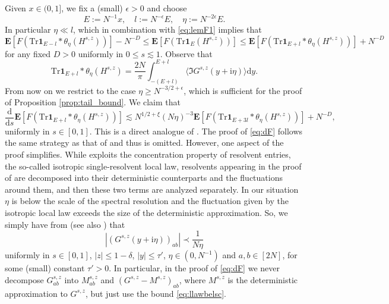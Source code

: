 \documentclass[10pt]{amsart}
\numberwithin{equation}{section}
\newcommand{\dif}{\mathrm{d}}
\newcommand{\E}{\mathbf{E}}
\newcommand{\ii}{\mathrm{i}}
\begin{document}
Given $x\in(0, 1]$, we fix a (small) $\epsilon>0$ and choose 
\begin{equation}
E:=N^{-1}x,\quad l:=N^{-\epsilon}E,\quad \eta:=N^{-2\epsilon}E.
\label{eq:F_GFT_param}
\end{equation}
In particular $\eta\ll l$, which in combination with \eqref{eq:lemF1} implies that
\begin{equation}
\E\left[F\left(\mathrm{Tr}\bm{1}_{E-l}*\theta_\eta(H^{s,z})\right)\right] - N^{-D}\le \E\left[F\left(\mathrm{Tr} \bm{1}_E(H^{s,z})\right)\right] \le \E\left[F\left(\mathrm{Tr}\bm{1}_{E+l}*\theta_\eta(H^{s,z})\right)\right] + N^{-D}
\label{eq:lemF2}
\end{equation}
for any fixed $D>0$ uniformly in $0\le s\lesssim 1$. Observe that
\begin{equation}
\mathrm{Tr}\bm{1}_{E+l}*\theta_\eta(H^{s,z}) = \frac{2N}{\pi}\int_{-(E+l)}^{E+l} \langle \Im G^{s,z}(y+\ii\eta)\rangle\dif y.
\label{eq:Tr_to_int}
\end{equation}
From now on we restrict to the case $\eta\ge N^{-3/2+\epsilon}$, which is sufficient for the proof of Proposition \ref{prop:tail_bound}. We claim that
\begin{equation}
\frac{\dif}{\dif s} \E \left[ F\left(\mathrm{Tr}\bm{1}_{E+l}*\theta_\eta(H^{s,z})\right)\right]\lesssim N^{1/2+\xi} (N\eta)^{-3}  \E \left[ F\left(\mathrm{Tr}\bm{1}_{E+3l}*\theta_\eta(H^{s,z})\right)\right] + N^{-D},
\label{eq:dF}
\end{equation}
uniformly in $s\in [0,1]$. This is a direct analogue of \cite[Eq.(2.62)]{small_dev}. The proof of \eqref{eq:dF} follows the same strategy as that of \cite[Eq.(2.62)]{small_dev} and thus is omitted. However, one aspect of the proof simplifies. While \cite{small_dev} exploits the concentration property of resolvent entries, the so-called isotropic single-resolvent local law, resolvents appearing in the proof of \cite[Eq.(2.62)]{small_dev} are decomposed into their deterministic counterparts and the fluctuations around them, and then these two terms are analyzed separately. In our situation $\eta$ is below the scale of the spectral resolution and the fluctuation given by the isotropic local law exceeds the size of the deterministic approximation. So, we simply have from \cite[Theorem~3.4]{singleG_circ} (see also \cite[Theorem~3.1]{nonHermdecay}) that
\begin{equation}
\label{eq:llawbelsc}
\left\vert(G^{s,z}(y+\ii\eta))_{ab}\right\vert\prec \frac{1}{N\eta}
\end{equation}
uniformly in $s\in [0,1]$, $|z|\le 1-\delta$, $|y|\le \tau'$, $\eta\in (0,N^{-1})$ and $a,b\in [2N]$, for some (small) constant $\tau'>0$. In particular, in the proof of \eqref{eq:dF} we never decompose $G^{s,z}_{ab}$ into $M^{s,z}_{ab}$ and $(G^{s,z}-M^{s,z})_{ab}$, where $M^{s,z}$ is the deterministic approximation to $G^{s,z}$, but just use the bound \eqref{eq:llawbelsc}.
\end{document}
